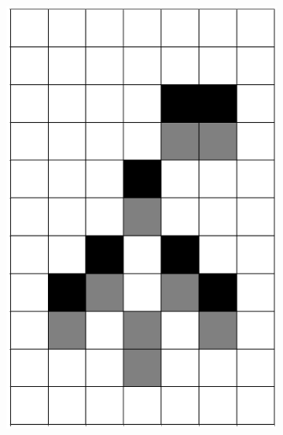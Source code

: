 \documentclass[12pt]{article}
\numberwithin{figure}{section} %
\begin{document}
\begin{figure}[H]
\begin{subfigure}{0.3\textwidth}
     \includegraphics[angle=270,width=\linewidth]{Section4/6.1}
     \subcaption{}
   \end{subfigure}
        \begin{subfigure}{0.3\textwidth}
     \centering

\end{subfigure}
\end{figure}
\end{document}
